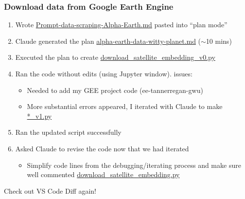 \documentclass[aspectratio=169, 12pt]{beamer}
\newcommand{\ghLtwo}{https://tannerregan.github.io/GWU_AI_study_group/code/lecture_2/}
\begin{document}
\begin{frame}
\frametitle{Download data from Google Earth Engine}

\begin{enumerate}
    \item Wrote \href{\ghLtwo/python_demo/Prompt-data-scraping-Alpha-Earth}{Prompt-data-scraping-Alpha-Earth.md} pasted into ``plan mode''
    \item Claude generated the plan \href{\ghLtwo/python_demo/alpha-earth-data-witty-planet.md}{alpha-earth-data-witty-planet.md} ($\sim$10 mins)
    \item Executed the plan to create \href{\ghLtwo/python_demo/download_satellite_embedding_v0.py}{download\_satellite\_embedding\_v0.py}
    \item Ran the code without edits (using Jupyter window).  issues: 
    \begin{itemize}
        \item Needed to add my GEE project code (ee-tannerregan-gwu)
        \item More substantial errors appeared, I iterated with Claude to make \href{\ghLtwo/python_demo/download_satellite_embedding_v1.py}{*\_v1.py}
    \end{itemize}
    \item Ran the updated script successfully
    \item Asked Claude to revise the code now that we had iterated
    \begin{itemize}
        \item Simplify code lines from the debugging/iterating process and make sure well commented \href{\ghLtwo/python_demo/download_satellite_embedding.py}{download\_satellite\_embedding.py}
    \end{itemize}
\end{enumerate}
\pause Check out VS Code Diff again!
\end{frame}
\end{document}
